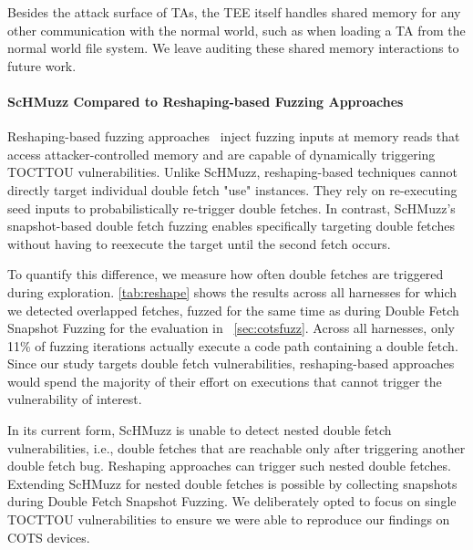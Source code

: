 \documentclass[conference]{IEEEtran}
\newcommand{\sysname}{ScHMuzz\xspace}
\newcommand{\stagetwo}{Double Fetch Snapshot Fuzzing\xspace}
\newcommand{\numexecsdfperc}{11\%\xspace}
\begin{document}
Besides the attack surface of TAs, the TEE 
itself handles shared memory for any other communication with the normal world, 
such as when loading a TA from the normal world file system. We leave auditing 
these shared memory interactions to future work.

\paragraph{\sysname Compared to Reshaping-based Fuzzing Approaches}

Reshaping-based fuzzing approaches~\cite{morphuzz, chen2024enclavefuzz} 
inject fuzzing inputs at memory reads that access 
attacker-controlled memory and are capable of dynamically triggering TOCTTOU vulnerabilities. 
Unlike \sysname, reshaping-based techniques cannot directly target individual double fetch "use" 
instances. They rely on re-executing seed inputs to probabilistically 
re-trigger double fetches. In contrast, \sysname's snapshot-based double fetch fuzzing 
enables specifically targeting double fetches without having to reexecute the target until 
the second fetch occurs. 

To quantify this difference, we measure 
how often double fetches are triggered during exploration. \autoref{tab:reshape} shows the results 
across all harnesses for which we detected overlapped fetches, fuzzed for the same time as during 
\stagetwo for the evaluation in ~\autoref{sec:cotsfuzz}. Across all harnesses, only 
\numexecsdfperc{} of fuzzing iterations actually execute a code path containing a double 
fetch. Since our study targets double fetch vulnerabilities, reshaping-based 
approaches would spend the majority of their effort on executions that cannot trigger the 
vulnerability of interest. 

In its current form, \sysname is unable to detect nested double fetch vulnerabilities, i.e., double fetches 
that are reachable only after triggering another double fetch bug. Reshaping approaches 
can trigger such nested double fetches. Extending \sysname for nested double fetches is possible 
by collecting snapshots during \stagetwo. We deliberately opted to focus on single TOCTTOU 
vulnerabilities to ensure we were able to reproduce our findings on COTS devices. 
\end{document}
